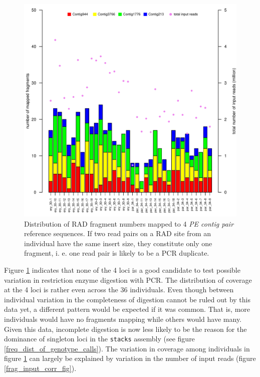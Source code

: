 \documentclass[a4paper,12pt,times,print,index, custombib]{PhDThesisPSnPDF}\usepackage[]{graphicx}\usepackage[]{color}
\newenvironment{knitrout}{}{} %
\begin{document}
\begin{figure}
\begin{knitrout}
\color{fgcolor}

{\centering \includegraphics[width=\linewidth]{figure/fragments_mapped_per_ind-1} 

}



\end{knitrout}
\caption{Distribution of RAD \gls{fragment} numbers mapped to 4 \emph{PE contig pair} reference sequences.  
If two read pairs on a RAD site from an individual have the same insert size, they constitute only one fragment, i. e. one read pair is likely to be a PCR duplicate.}
\label{fragments-mapped-per-ind}
\end{figure}

Figure \ref{fragments-mapped-per-ind} indicates that none of the 4 loci is a good candidate to test possible variation in restriction enzyme digestion with PCR. The distribution of coverage at the 4 loci is rather even across the 36 individuals. Even though between individual variation in the completeness of digestion cannot be ruled out by this data yet, a different pattern would be expected if it was common. That is, more individuals would have no fragments mapping while others would have many. Given this data, incomplete digestion is now less likely to be the reason for the dominance of singleton loci in the \texttt{stacks} assembly (see figure \ref{freq_dist_of_genotype_calls}). The variation in coverage among individuals in figure \ref{fragments-mapped-per-ind} can largely be explained by variation in the number of input reads (figure \ref{frag_input_corr_fig}).
\end{document}
